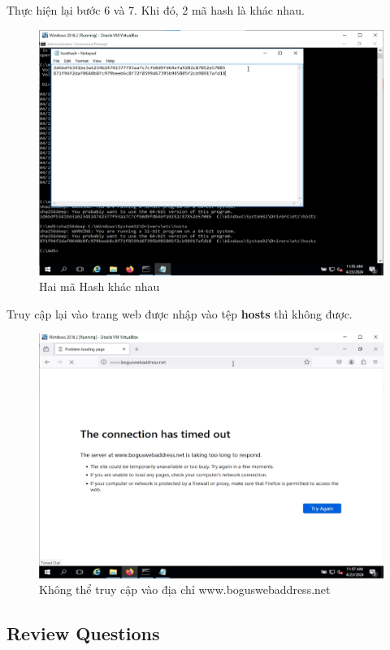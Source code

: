  Thực hiện lại bước 6 và 7. Khi đó, 2 mã hash là khác nhau.

\begin{figure}[!htb]
    \centering
    \includegraphics[width=0.85\linewidth]{figure//chapter9//lab9_1/diff-hash.png}
    \caption{Hai mã Hash khác nhau}
    \label{fig:enter-label}
\end{figure}

 Truy cập lại vào trang web được nhập vào tệp \textbf{hosts} thì không được.

\begin{figure}[!htb]
    \centering
    \includegraphics[width=0.8\linewidth]{figure//chapter9//lab9_1/failed-access.png}
    \caption{Không thể truy cập vào địa chỉ www.boguswebaddress.net}
    \label{fig:enter-label}
\end{figure}

\newpage

\subsection{Review Questions}

